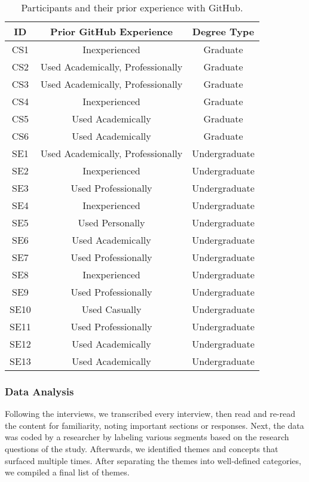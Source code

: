 \begin{table}[h]
    \vspace{1pt}
        \caption{Participants and their prior experience with GitHub.}\label{table:interviews:students}
    \vspace{1pt}
    \begin{center}
        \begin{tabular}{c | c | c}
            \hline
            ID & Prior GitHub Experience & Degree Type \\
            \hline
            CS1 & Inexperienced & Graduate \\ \hline
            CS2 & Used Academically, Professionally & Graduate \\ \hline
            CS3 & Used Academically, Professionally & Graduate \\ \hline
            CS4 & Inexperienced & Graduate \\ \hline
            CS5 & Used Academically & Graduate \\ \hline
            CS6 & Used Academically & Graduate \\ \hline
            SE1 & Used Academically, Professionally & Undergraduate \\ \hline
            SE2 & Inexperienced & Undergraduate \\ \hline
            SE3 & Used Professionally & Undergraduate \\ \hline
            SE4 & Inexperienced & Undergraduate \\ \hline
            SE5 & Used Personally & Undergraduate \\ \hline
            SE6 & Used Academically & Undergraduate \\ \hline
            SE7 & Used Professionally & Undergraduate \\ \hline
            SE8 & Inexperienced & Undergraduate \\ \hline
            SE9 & Used Professionally & Undergraduate \\ \hline
            SE10 & Used Casually & Undergraduate \\ \hline
            SE11 & Used Professionally & Undergraduate \\ \hline
            SE12 & Used Academically & Undergraduate \\ \hline
            SE13 & Used Academically & Undergraduate \\ \hline
        \end{tabular}
    \end{center}
\end{table}

\subsubsection{Data Analysis}
Following the interviews, we transcribed every interview, then read and re-read the content for familiarity, noting important sections or responses. Next, the data was coded by a researcher by labeling various segments based on the research questions of the study. Afterwards, we identified themes and concepts that surfaced multiple times. After separating the themes into well-defined categories, we compiled a final list of themes.
